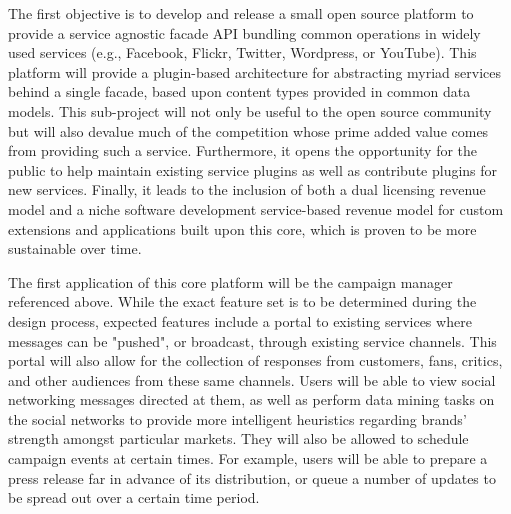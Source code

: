 \documentclass{report}
\begin{document}
The first objective is to develop and release a small open source
platform to provide a service agnostic facade API bundling common
operations in widely used services (e.g., Facebook, Flickr, Twitter,
Wordpress, or YouTube). This platform will provide a plugin-based
architecture for abstracting myriad services behind a single facade,
based upon content types provided in common data models. This
sub-project will not only be useful to the open source community but
will also devalue much of the competition whose prime added value
comes from providing such a service. Furthermore, it opens the
opportunity for the public to help maintain existing service plugins
as well as contribute plugins for new services. Finally, it leads to
the inclusion of both a dual licensing revenue model and a niche
software development service-based revenue model for custom extensions
and applications built upon this core, which is proven to be more
sustainable over time.
 
The first application of this core platform will be the campaign
manager referenced above.  While the exact feature set is to be
determined during the design process, expected features include a
portal to existing services where messages can be "pushed", or
broadcast, through existing service channels. This portal will also
allow for the collection of responses from customers, fans, critics,
and other audiences from these same channels. Users will be able to
view social networking messages directed at them, as well as perform
data mining tasks on the social networks to provide more intelligent
heuristics regarding brands' strength amongst particular markets. They
will also be allowed to schedule campaign events at certain
times. For example, users will be able to prepare a press release far in advance of
its distribution, or queue a number of updates to be spread out over a
certain time period.
\end{document}
